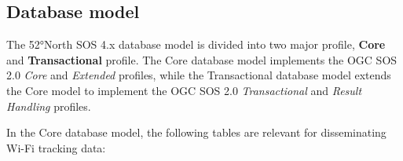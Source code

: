 \subsection{Database model}
The 52°North SOS 4.x database model is divided into two major profile,
\textbf{Core} and \textbf{Transactional} profile. The Core database model
implements the OGC SOS 2.0 \textit{Core} and \textit{Extended} profiles, while
the Transactional database model extends the Core model to implement the OGC SOS
2.0 \textit{Transactional} and \textit{Result Handling} profiles. 

In the Core database model, the following tables are relevant for disseminating
Wi-Fi tracking data:
